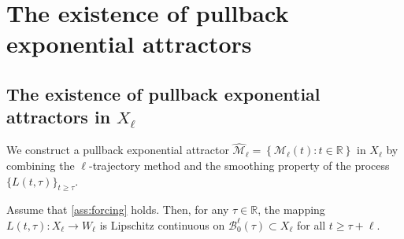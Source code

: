 \documentclass[oneside,preprint,12pt,numbers,sort&compress]{elsarticle}
\begin{document}
\section{The existence of pullback exponential attractors}\label{sec04}
\subsection{The existence of pullback exponential attractors in \texorpdfstring{$X_{\ell}$}{xl}}\label{subsec0401}
We construct a pullback exponential attractor $\hat{\mathcal{M}}_{\ell} = \left\{ \mathcal{M}_{\ell} (t): t \in \mathbb{R} \right\}$ in $X_{\ell}$ by combining the $\ell$-trajectory method and the smoothing property of the process $\{L(t, \tau)\}_{t \geq \tau}$.

\begin{lemma}\label{lem0401}
Assume that \cref{ass:forcing} holds. Then, for any $\tau \in \mathbb{R}$, the mapping $L(t, \tau) : X_\ell \to W_\ell$ is Lipschitz continuous on $\mathcal{B}_0^\ell(\tau) \subset X_\ell$ for all $t \geq \tau + \ell$.  
\end{lemma}
\end{document}
